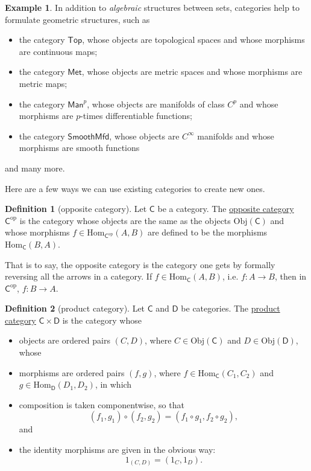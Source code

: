 \documentclass[a4paper]{report}
\newcommand{\defn}[1]{\ul{#1}}
\newcommand{\Obj}{\mathrm{Obj}}
\newcommand{\Hom}{\mathrm{Hom}}
\theoremstyle{definition}
\newtheorem{definition}{Definition}[section]
\newtheorem{example}{Example}[section]
\theoremstyle{plain}
\theoremstyle{remark}
\begin{document}
\begin{example}
  \label{eg:moreexamplesofcategories}
  In addition to \emph{algebraic} structures between sets, categories help to formulate geometric structures, such as
  \begin{itemize}
    \item the category $\mathsf{Top}$, whose objects are topological spaces and whose morphisms are continuous maps;
    \item the category $\mathsf{Met}$, whose objects are metric spaces and whose morphisms are metric maps;
    \item the category $\mathsf{Man}^{p}$, whose objects are manifolds of class $C^{p}$ and whose morphisms are $p$-times differentiable functions;

    \item the category $\mathsf{SmoothMfd}$, whose objects are $C^{\infty}$ manifolds and whose morphisms are smooth functions
  \end{itemize}
  and many more.
\end{example}

Here are a few ways we can use existing categories to create new ones.
\begin{definition}[opposite category]
  \label{def:oppositecategory}
  Let $\mathsf{C}$ be a category. The \defn{opposite category} $\mathsf{C}^{\mathrm{op}}$ is the category whose objects are the same as the objects $\Obj(\mathsf{C})$ and whose morphisms $f \in \Hom_{\mathsf{C}^{\mathrm{op}}}(A, B)$ are defined to be the morphisms $\Hom_{\mathsf{C}}(B, A)$.

  That is to say, the opposite category is the category one gets by formally reversing all the arrows in a category. If $f \in \Hom_{\mathsf{C}}(A, B)$, i.e. $f \colon A \to B$, then in $\mathsf{C}^{\mathrm{op}}$, $f\colon B \to A$. 
\end{definition} 

\begin{definition}[product category]
  \label{def:productcategory}
  Let $\mathsf{C}$ and $\mathsf{D}$ be categories. The \defn{product category} $\mathsf{C} \times \mathsf{D}$ is the category whose 
  \begin{itemize}
    \item objects are ordered pairs $(C, D)$, where $C \in \Obj(\mathsf{C})$ and $D \in \Obj(\mathsf{D})$, whose
    \item morphisms are ordered pairs $(f,g)$, where $f \in \Hom_{\mathsf{C}}(C_{1}, C_{2})$ and $g \in \Hom_{\mathsf{D}}(D_{1}, D_{2})$, in which
    \item composition is taken componentwise, so that
      \begin{equation*}
        (f_{1}, g_{1}) \circ (f_{2},g_{2}) = (f_{1} \circ g_{1}, f_{2} \circ g_{2}),
      \end{equation*}
      and
    \item the identity morphisms are given in the obvious way:
      \begin{equation*}
        1_{(C,D)} = (1_{C}, 1_{D}).
      \end{equation*}
  \end{itemize}
\end{definition}
\end{document}
